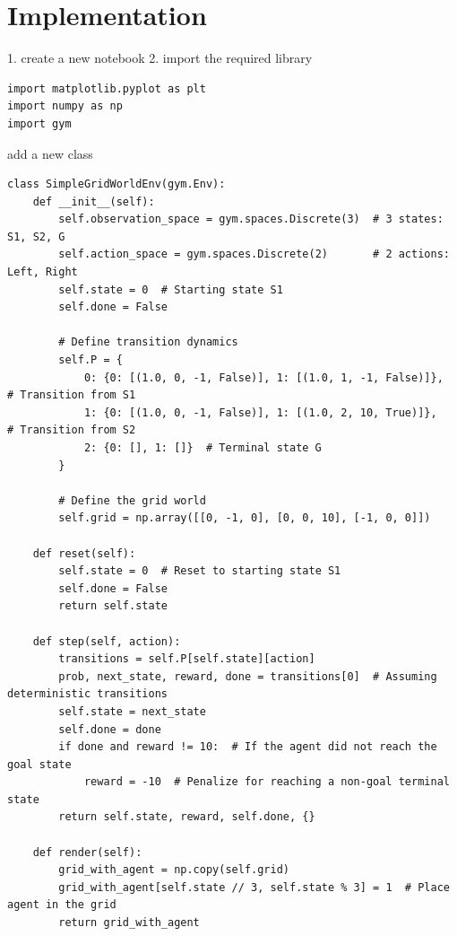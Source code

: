 \documentclass{article}
\begin{document}
\section{Implementation}
1. create a new notebook 
2. import the required library 
\begin{lstlisting}
import matplotlib.pyplot as plt
import numpy as np
import gym

\end{lstlisting}
add a new class 
\begin{lstlisting}
class SimpleGridWorldEnv(gym.Env):
    def __init__(self):
        self.observation_space = gym.spaces.Discrete(3)  # 3 states: S1, S2, G
        self.action_space = gym.spaces.Discrete(2)       # 2 actions: Left, Right
        self.state = 0  # Starting state S1
        self.done = False

        # Define transition dynamics
        self.P = {
            0: {0: [(1.0, 0, -1, False)], 1: [(1.0, 1, -1, False)]},  # Transition from S1
            1: {0: [(1.0, 0, -1, False)], 1: [(1.0, 2, 10, True)]},   # Transition from S2
            2: {0: [], 1: []}  # Terminal state G
        }

        # Define the grid world
        self.grid = np.array([[0, -1, 0], [0, 0, 10], [-1, 0, 0]])

    def reset(self):
        self.state = 0  # Reset to starting state S1
        self.done = False
        return self.state

    def step(self, action):
        transitions = self.P[self.state][action]
        prob, next_state, reward, done = transitions[0]  # Assuming deterministic transitions
        self.state = next_state
        self.done = done
        if done and reward != 10:  # If the agent did not reach the goal state
            reward = -10  # Penalize for reaching a non-goal terminal state
        return self.state, reward, self.done, {}

    def render(self):
        grid_with_agent = np.copy(self.grid)
        grid_with_agent[self.state // 3, self.state % 3] = 1  # Place agent in the grid
        return grid_with_agent
\end{lstlisting}
\end{document}
